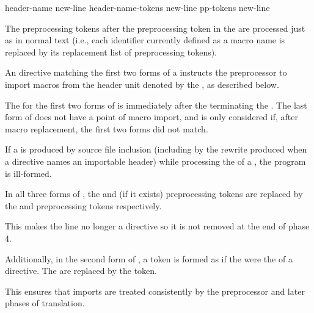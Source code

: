 \begin{bnf}
\br
      header-name  \terminal{;} new-line\br
      header-name-tokens  \terminal{;} new-line\br
      pp-tokens \terminal{;} new-line
\end{bnf}

\pnum
The preprocessing tokens after the  preprocessing token
in the  
are processed just as in normal text
(i.e., each identifier currently defined as a macro name
is replaced by its replacement list of preprocessing tokens).
\begin{note}
An  directive
matching the first two forms of a 
instructs the preprocessor to import macros
from the header unit
denoted by the ,
as described below.
\end{note}
%
The  for the
first two forms of  is
immediately after the  terminating
the .
The last form of 
does not have a point of macro import, and
is only considered if, after macro replacement,
the first two forms did not match.

\pnum
If a  is produced by source file inclusion
(including by the rewrite produced
when a  directive names an importable header)
while processing the  of a ,
the program is ill-formed.

\pnum
In all three forms of ,
the  and  (if it exists) preprocessing tokens
are replaced by the  and
 preprocessing tokens respectively.
\begin{note}
This makes the line no longer a directive
so it is not removed at the end of phase 4.
\end{note}
Additionally, in the second form of ,
a  token is formed as if
the 
were the  of a  directive.
The  are replaced by
the  token.
\begin{note}
This ensures that imports are treated consistently by
the preprocessor and later phases of translation.
\end{note}

